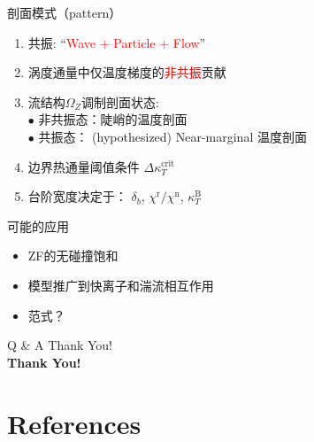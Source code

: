 \documentclass[9pt,aspectratio=169]{ctexbeamer}
\begin{document}
\begin{frame}{\secname}
 \vspace{-0.7cm}
 \begin{minipage}[t]{0.6\textwidth}
  \begin{alertblock}{剖面模式（pattern）}
    \begin{enumerate}
      \item 共振: “\textcolor{red}{Wave + Particle + Flow}”
      \item 涡度通量中仅温度梯度的\textcolor{red}{非共振}贡献
      \item 流结构$ \Omega_Z $调制剖面状态:\\
        $\bullet$ 非共振态：陡峭的温度剖面\\
        $\bullet$ 共振态： (hypothesized) Near-marginal 温度剖面
      \item 边界热通量阈值条件 $ \Delta \kappa_T^{\mathrm{crit}} $
      \item 台阶宽度决定于： $ \delta_b $, $ \chi^{\mathrm{r}}/\chi^{\mathrm{n}} $, $ \kappa_T^{\mathrm{B}} $
    \end{enumerate}
    \vspace{-0.2cm}
  \end{alertblock}
 \end{minipage}
 \hspace{0.4cm}
 \begin{minipage}[t]{0.35\textwidth}
   \begin{block}{可能的应用}
    \begin{itemize}
      \item ZF的无碰撞饱和
      \item 模型推广到快离子和湍流相互作用
      \item 范式？
    \end{itemize}
    \vspace{-0.2cm}
   \end{block}
   \cite{yan_staircase_2022}
 \end{minipage}
\end{frame}


\begin{frame}{Q \& A}
  \centering
  \huge Thank You!\\
  \textbf{Thank You!}
\end{frame}

\section*{References}

\begin{frame}%
\frametitle{\secname}

\end{frame}
\end{document}
